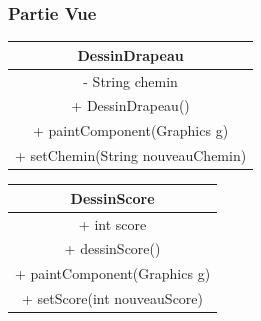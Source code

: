 \documentclass{article}
\begin{document}
\subsubsection{Partie Vue}
\begin{center}
\begin{tabular}{|c|}
	\hline
	DessinDrapeau\\
	\hline
	- String chemin\\
	\hline
	+ DessinDrapeau()\\
	+ paintComponent(Graphics g)\\
	+ setChemin(String nouveauChemin)\\
	\hline
\end{tabular}
\hspace{2cm} \begin{tabular}{|c|}
	 \hline
	 DessinScore\\
	 \hline
	 + int score\\
	 \hline
	 + dessinScore()\\
	 + paintComponent(Graphics g)\\
	 + setScore(int nouveauScore)\\
	 \hline
\end{tabular}


\end{center}
\end{document}
